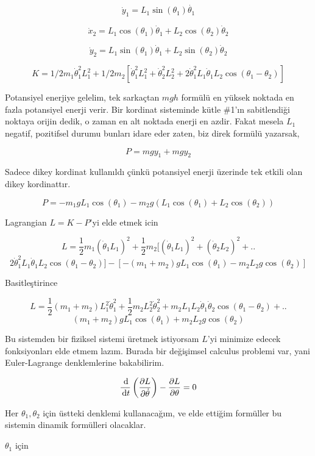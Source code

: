 \documentclass[12pt,fleqn]{article}\usepackage{../../common}
\begin{document}
$$
\dot{y}_1 = L_1 \sin(\theta_1)\dot{\theta_1}
$$

$$
\dot{x}_2 = L_1 \cos(\theta_1)\dot{\theta}_1 + L_2 \cos (\theta_2)\dot{\theta}_2
$$

$$
\dot{y}_2 = L_1 \sin(\theta_1)\dot{\theta}_1 + L_2 \sin(\theta_2)\dot{\theta}_2
$$

$$
K = 
1/2 m_1 \dot{\theta}_1^2 L_1^2 + 
1/2 m_2 [
 \dot{\theta}_1^2 L_1^2 + \dot{\theta}_2^2 L_2^2  + 
 2 \dot{\theta}_1^2 L_1 \dot{\theta}_1L_2\cos(\theta_1 - \theta_2)]
$$

Potansiyel enerjiye gelelim, tek sarkaçtan $m g h$ formülü en yüksek
noktada en fazla potansiyel enerji verir. Bir kordinat sisteminde kütle
\#1'ın sabitlendiği noktaya orijin dedik, o zaman en alt noktada enerji en
azdir. Fakat mesela $L_1$ negatif, pozitifsel durumu bunları idare eder
zaten, biz direk formülü yazarsak,

$$
P = m g y_1 + m g y_2
$$

Sadece dikey kordinat kullanıldı çünkü potansiyel enerji üzerinde tek
etkili olan dikey kordinattır. 

$$
P = -m_1 g L_1 \cos(\theta_1) - m_2 g (L_1 \cos(\theta_1) + L_2 \cos(\theta_2))
$$

Lagrangian $L = K - P$'yi elde etmek icin 

$$
L = 
\frac{1}{2} m_1 (\dot{\theta}_1 L_1)^2 + 
\frac{1}{2} m_2 [(\dot{\theta}_1L_1)^2 + 
(\dot{\theta}_2 L_2 )^2  +  ..
$$
$$
 2 \dot{\theta}_1^2 L_1 \dot{\theta}_1L_2\cos(\theta_1 - \theta_2)] -
[-(m_1+m_2) g L_1 \cos(\theta_1) - m_2 L_2 g \cos(\theta_2)]
$$

Basitleştirince

$$
L = \frac{1}{2} (m_1 + m_2) L_1^2 \dot{\theta}_1^2 + 
\frac{1}{2} m_2 L_2^2 \dot{\theta}_2^2 + 
m_2 L_1 L_2 \dot{\theta}_1\dot{\theta}_2 \cos(\theta_1-\theta_2) + ..
$$
$$
(m_1 + m_2) g L_1 \cos(\theta_1) + m_2 L_2  g \cos(\theta_2)
$$

Bu sistemden bir fiziksel sistemi üretmek istiyorsam $L$'yi minimize edecek
fonksiyonları elde etmem lazım. Burada bir değişimsel calculus problemi
var, yani Euler-Lagrange denklemlerine bakabilirim. 

$$
\frac{\,\mathrm{d}}{\,\mathrm{d} t} \left(
\frac{\partial L}{\partial \dot{\theta}} 
\right) -
\frac{\partial L}{\partial \theta} = 0
$$

Her $\theta_1,\theta_2$ için üstteki denklemi kullanacağım, ve elde ettiğim
formüller bu sistemin dinamik formülleri olacaklar. 

$\theta_1$ için
\end{document}
